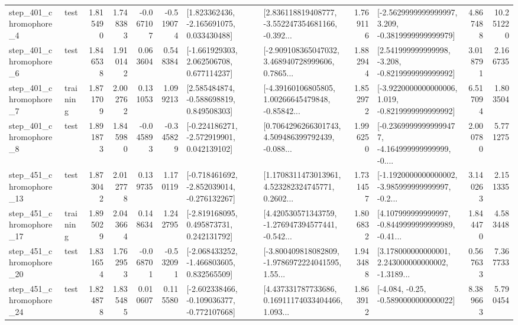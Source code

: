\begin{tabular}{llrrrrllrlrr}
   step\_401\_chromophore\_4 &      test &      1.815490 &    1.748383 &     -0.067107 & -0.519074 &    [1.823362436, -2.165691075, 0.033430488] &  [2.836118819408777, -3.552247354681166, -0.392... &       1.769116 &  [-2.5629999999999997, 3.209, -0.3819999999999979] &            4.867488 &         10.251220 \\
   step\_401\_chromophore\_6 &      test &      1.846538 &    1.910142 &      0.063604 &  0.548384 &    [-1.661929303, 2.062506708, 0.677114237] &  [-2.909108365047032, 3.468940728999606, 0.7865... &       1.882944 &   [2.541999999999998, -3.208, -0.8219999999999992] &            3.018791 &          2.166735 \\
   step\_401\_chromophore\_7 &  training &      1.871709 &    2.002762 &      0.131053 &  1.099213 &    [2.585484874, -0.588698819, 0.849508303] &  [-4.39160106805805, 1.00266645479848, -0.85842... &       1.852972 &  [-3.9220000000000006, 1.019, -0.8219999999999992] &            6.517094 &          1.803504 \\
   step\_401\_chromophore\_8 &      test &      1.891873 &    1.845980 &     -0.045893 & -0.345829 &   [-0.224186271, -2.572919901, 0.042139102] &  [0.7064296266301743, 4.509486399792439, -0.088... &       1.996250 &  [-0.23699999999999477, -4.164999999999999, -0.... &            2.000780 &          5.771275 \\
  step\_451\_chromophore\_13 &      test &      1.873042 &    2.012778 &      0.139735 &  1.170119 &  [-0.718461692, -2.852039014, -0.276132267] &  [1.1708311473013961, 4.523282324745771, 0.2602... &       1.731457 &  [-1.1920000000000002, -3.985999999999997, -0.2... &            3.140263 &          2.151335 \\
  step\_451\_chromophore\_17 &  training &      1.895029 &    2.043664 &      0.148634 &  1.242795 &    [-2.819168095, 0.495873731, 0.242131792] &  [4.420530571343759, -1.276947394577441, -0.542... &       1.806832 &  [4.107999999999997, -0.8449999999999989, -0.41... &            1.844470 &          4.583448 \\
  step\_451\_chromophore\_20 &      test &      1.831654 &    1.762953 &     -0.068701 & -0.532091 &   [-2.068433252, -1.466803605, 0.832565509] &  [-3.800409818082809, -1.9786972224041595, 1.55... &       1.943488 &  [3.178000000000001, 2.243000000000002, -1.3189... &            0.567633 &          7.367733 \\
  step\_451\_chromophore\_24 &      test &      1.824878 &    1.835485 &      0.010607 &  0.115580 &  [-2.602338466, -0.109036377, -0.772107668] &  [4.437331787733686, 0.16911174033404466, 1.093... &       1.863912 &               [-4.084, -0.25, -0.5890000000000022] &            8.389663 &          5.790454 \\

\end{tabular}
